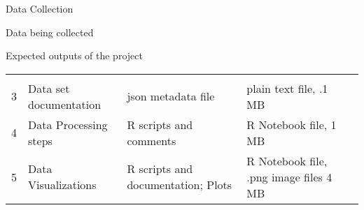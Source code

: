 \documentclass[ignorenonframetext,]{beamer}
\begin{document}
\begin{frame}[fragile]{Data Collection}
\begin{block}{Data being collected}
\begin{block}{Expected outputs of the project}
\begin{longtable}[]{@{}cllll@{}}
\begin{minipage}[t]{0.18\columnwidth}
\strut
\end{minipage}\tabularnewline
\begin{minipage}[t]{0.11\columnwidth}\centering\strut
3\strut
\end{minipage} & \begin{minipage}[t]{0.11\columnwidth}\raggedright\strut
Data set documentation\strut
\end{minipage} & \begin{minipage}[t]{0.16\columnwidth}\raggedright\strut
json metadata file\strut
\end{minipage} & \begin{minipage}[t]{0.14\columnwidth}\raggedright\strut
plain text file, .1 MB\strut
\end{minipage} & \begin{minipage}[t]{0.18\columnwidth}\raggedright\strut
\strut
\end{minipage}\tabularnewline
\begin{minipage}[t]{0.11\columnwidth}\centering\strut
4\strut
\end{minipage} & \begin{minipage}[t]{0.11\columnwidth}\raggedright\strut
Data Processing steps\strut
\end{minipage} & \begin{minipage}[t]{0.16\columnwidth}\raggedright\strut
R scripts and comments\strut
\end{minipage} & \begin{minipage}[t]{0.14\columnwidth}\raggedright\strut
R Notebook file, 1 MB\strut
\end{minipage} & \begin{minipage}[t]{0.18\columnwidth}\raggedright\strut
\strut
\end{minipage}\tabularnewline
\begin{minipage}[t]{0.11\columnwidth}\centering\strut
5\strut
\end{minipage} & \begin{minipage}[t]{0.11\columnwidth}\raggedright\strut
Data Visualizations\strut
\end{minipage} & \begin{minipage}[t]{0.16\columnwidth}\raggedright\strut
R scripts and documentation; Plots\strut
\end{minipage} & \begin{minipage}[t]{0.14\columnwidth}\raggedright\strut
R Notebook file, .png image files 4 MB\strut
\end{minipage} & \begin{minipage}[t]{0.18\columnwidth}\raggedright\strut

\end{minipage}
\end{longtable}
\end{block}
\end{block}
\end{frame}
\end{document}
